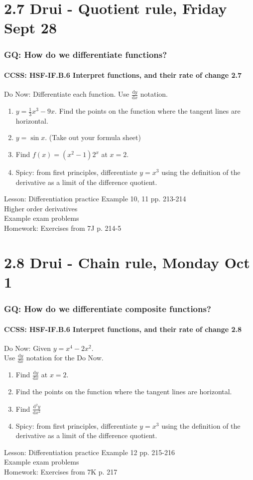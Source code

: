 \documentclass{beamer}
\begin{document}
\section{2.7 Drui - Quotient rule, Friday Sept 28}
  \frame
  {
    \frametitle{GQ: How do we differentiate functions?}
    \framesubtitle{CCSS: HSF-IF.B.6 Interpret functions, and their rate of change  \alert{2.7}}

    \begin{block}{Do Now: Differentiate each function. Use $\frac{\mathrm{d}y}{\mathrm{d}x}$ notation.}
      \begin{enumerate}
      \item $y= \frac{1}{3}x^3-9x$. Find the points on the function where the tangent lines are horizontal.
      \item $y=\sin x$. (Take out your formula sheet)
      \item Find $f(x)=(x^2-1) 2^x$ at $x=2$.
      \item Spicy: from first principles, differentiate $y=x^3$ using the definition of the derivative as a limit of the difference quotient.
      \end{enumerate}
   \end{block}
    Lesson: Differentiation practice Example 10, 11 pp. 213-214\\
    Higher order derivatives \\
    Example exam problems\\ \bigskip
    Homework: Exercises from 7J p. 214-5
  }

\section{2.8 Drui - Chain rule, Monday Oct 1}
  \frame
  {
    \frametitle{GQ: How do we differentiate composite functions?}
    \framesubtitle{CCSS: HSF-IF.B.6 Interpret functions, and their rate of change  \alert{2.8}}

    \begin{block}{Do Now: Given $y= x^4-2x^2$. \\Use $\frac{\mathrm{d}y}{\mathrm{d}x}$ notation for the Do Now.}
      \begin{enumerate}
      \item Find $\frac{\mathrm{d}y}{\mathrm{d}x}$ at $x=2$.
      \item Find the points on the function where the tangent lines are horizontal.
      \item Find $\frac{\mathrm{d}^2y}{\mathrm{d}x^2}$
      \item Spicy: from first principles, differentiate $y=x^3$ using the definition of the derivative as a limit of the difference quotient.
      \end{enumerate}
   \end{block}
    Lesson: Differentiation practice Example 12 pp. 215-216\\
    Example exam problems\\ \bigskip
    Homework: Exercises from 7K p. 217
  }
\end{document}
